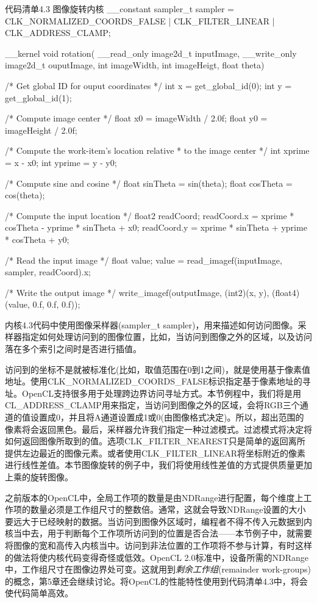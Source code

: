 \begin{codeboxt}[cpp]{代码清单4.3 图像旋转内核}
__constant sampler_t sampler =
  CLK_NORMALIZED_COORDS_FALSE |
  CLK_FILTER_LINEAR           |
  CLK_ADDRESS_CLAMP;

__kernel
void rotation(
  __read_only image2d_t inputImage,
  __write_only image2d_t ouputImage,
  int imageWidth,
  int imageHeigt,
  float theta)
{
  /* Get global ID for ouput coordinates */
  int x = get_global_id(0);
  int y = get_global_id(1);

  /* Compute image center */
  float x0 = imageWidth / 2.0f;
  float y0 = imageHeight / 2.0f;

  /* Compute the work-item's location relative
   * to the image center */
  int xprime = x - x0;
  int yprime = y - y0;

  /* Compute sine and cosine */
  float sinTheta = sin(theta);
  float cosTheta = cos(theta);

  /* Compute the input location */
  float2 readCoord;
  readCoord.x = xprime * cosTheta - yprime * sinTheta + x0;
  readCoord.y = xprime * sinTheta + yprime * cosTheta + y0;

  /* Read the input image */
  float value;
  value = read_imagef(inputImage, sampler, readCoord).x;

  /* Write the output image */
  write_imagef(outputImage, (int2)(x, y), (float4)(value, 0.f, 0.f, 0.f));
}
\end{codeboxt}

内核4.3代码中使用图像采样器(sampler\_\allowbreak{}t sampler)，用来描述如何访问图像。采样器指定如何处理访问到的图像位置，比如，当访问到图像之外的区域，以及访问落在多个索引之间时是否进行插值。

访问到的坐标不是就被标准化(比如，取值范围在0到1之间)，就是使用基于像素值地址。使用CLK\_\allowbreak{}NORMALIZED\_\allowbreak{}COORDS\_\allowbreak{}FALSE标识指定基于像素地址的寻址。OpenCL支持很多用于处理跨边界访问寻址方式。本节例程中，我们将是用CL\_\allowbreak{}ADDRESS\_\allowbreak{}CLAMP用来指定，当访问到图像之外的区域，会将RGB三个通道的值设置成0，并且将A通道设置成1或0(由图像格式决定)。所以，超出范围的像素将会返回黑色。最后，采样器允许我们指定一种过滤模式。过滤模式将决定将如何返回图像所取到的值。选项CLK\_\allowbreak{}FILTER\_\allowbreak{}NEAREST只是简单的返回离所提供左边最近的图像元素。或者使用CLK\_\allowbreak{}FILTER\_\allowbreak{}LINEAR将坐标附近的像素进行线性差值。本节图像旋转的例子中，我们将使用线性差值的方式提供质量更加上乘的旋转图像。

之前版本的OpenCL中，全局工作项的数量是由NDRange进行配置，每个维度上工作项的数量必须是工作组尺寸的整数倍。通常，这就会导致NDRange设置的大小要远大于已经映射的数据。当访问到图像外区域时，编程者不得不传入元数据到内核当中去，用于判断每个工作项所访问到的位置是否合法——本节例子中，就需要将图像的宽和高传入内核当中。访问到非法位置的工作项将不参与计算，有时这样的做法将使内核代码变得奇怪或低效。OpenCL 2.0标准中，设备所需的NDRange中，工作组尺寸在图像边界处可变。这就用到\emph{剩余工作组}(remainder work-groups)的概念，第5章还会继续讨论。将OpenCL的性能特性使用到代码清单4.3中，将会使代码简单高效。

